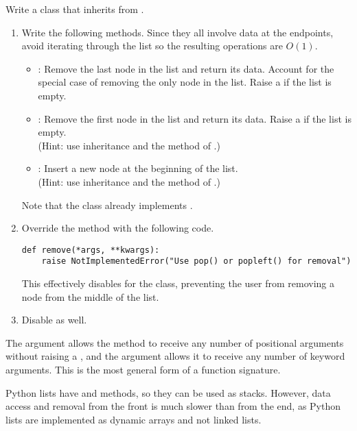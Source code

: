 \begin{problem} %
Write a  class that inherits from .
%
\begin{enumerate}
\item Write the following methods.
Since they all involve data at the endpoints, avoid iterating through the list so the resulting operations are $O(1)$.
\begin{itemize}
    \item {}: Remove the last node in the list and return its data.
    Account for the special case of removing the only node in the list.
    Raise a  if the list is empty.
    \item {}: Remove the first node in the list and return its data.
    Raise a  if the list is empty.
    \\(Hint: use inheritance and the  method of .)
    \item {}: Insert a new node at the beginning of the list.
    \\(Hint: use inheritance and the  method of .)
\end{itemize}
Note that the  class already implements .

\item Override the  method with the following code.

\begin{lstlisting}
def remove(*args, **kwargs):
    raise NotImplementedError("Use pop() or popleft() for removal")
\end{lstlisting}

This effectively disables  for the  class, preventing the user from removing a node from the middle of the list.

\item Disable  as well.
\end{enumerate}
\end{problem}

\begin{info}
The  argument allows the  method to receive any number of positional arguments without raising a , and the  argument allows it to receive any number of keyword arguments.
This is the most general form of a function signature.
\end{info}

Python lists have  and  methods, so they can be used as stacks.
However, data access and removal from the front is much slower than from the end, as Python lists are implemented as dynamic arrays and not linked lists.

